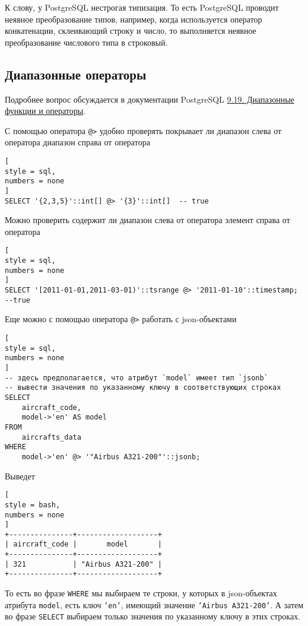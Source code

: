 \documentclass[%
	11pt,
	a4paper,
	utf8,
		]{article}
\begin{document}
К слову, у PostgreSQL нестрогая типизация. То есть PostgreSQL проводит неявное преобразование типов, например, когда используется оператор конкатенации, склеивающий строку и число, то выполняется неявное преобразование числового типа в строковый.

\subsection{Диапазонные операторы}

Подробнее вопрос обсуждается в документации PostgreSQL \href{https://postgrespro.ru/docs/postgrespro/10/functions-range}{9.19. Диапазонные функции и операторы}.

С помощью оператора \verb|@>| удобно проверять покрывает ли диапазон слева от оператора диапазон справа от оператора
\begin{lstlisting}[
style = sql,
numbers = none
]
SELECT '{2,3,5}'::int[] @> '{3}'::int[]  -- true
\end{lstlisting}

Можно проверить содержит ли диапазон слева от оператора элемент справа от оператора
\begin{lstlisting}[
style = sql,
numbers = none
]
SELECT '[2011-01-01,2011-03-01)'::tsrange @> '2011-01-10'::timestamp;  --true
\end{lstlisting}

Еще можно с помощью оператора \texttt{@>} работать с json-объектами
\begin{lstlisting}[
style = sql,
numbers = none
]
-- здесь предполагается, что атрибут `model` имеет тип `jsonb`
-- вывести значения по указанному ключу в соответствующих строках
SELECT
    aircraft_code,
    model->'en' AS model
FROM
    aircrafts_data
WHERE
    model->'en' @> '"Airbus A321-200"'::jsonb;
\end{lstlisting}

Выведет
\begin{lstlisting}[
style = bash,
numbers = none
]
+---------------+-------------------+
| aircraft_code |       model       |
+---------------+-------------------+
| 321           | "Airbus A321-200" |
+---------------+-------------------+
\end{lstlisting}

То есть во фразе \texttt{WHERE} мы выбираем те строки, у которых в json-объектах атрибута \texttt{model}, есть ключ \texttt{'en'}, имеющий значение \texttt{'Airbus A321-200'}. А затем во фразе \texttt{SELECT} выбираем только значения по указанному ключу в этих строках.
\end{document}
